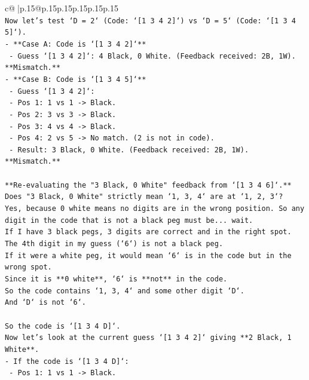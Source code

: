 \documentclass{article}
\begin{document}
{\begin{supertabular}{c@{$\;$}|p{.15\linewidth}@{}p{.15\linewidth}p{.15\linewidth}p{.15\linewidth}p{.15\linewidth}p{.15\linewidth}}
{{{\\ 
\texttt{Now let's test `D = 2` (Code: `{[}1 3 4 2{]}`) vs `D = 5` (Code: `{[}1 3 4 5{]}`).} \\
\texttt{{-} **Case A: Code is `{[}1 3 4 2{]}`**} \\
\texttt{    {-} Guess `{[}1 3 4 2{]}`: 4 Black, 0 White. (Feedback received: 2B, 1W). **Mismatch.**} \\
\texttt{{-} **Case B: Code is `{[}1 3 4 5{]}`**} \\
\texttt{    {-} Guess `{[}1 3 4 2{]}`:} \\
\texttt{        {-} Pos 1: 1 vs 1 {-}> Black.} \\
\texttt{        {-} Pos 2: 3 vs 3 {-}> Black.} \\
\texttt{        {-} Pos 3: 4 vs 4 {-}> Black.} \\
\texttt{        {-} Pos 4: 2 vs 5 {-}> No match. (2 is not in code).} \\
\texttt{        {-} Result: 3 Black, 0 White. (Feedback received: 2B, 1W). **Mismatch.**} \\
\\ 
\texttt{**Re{-}evaluating the "3 Black, 0 White" feedback from `{[}1 3 4 6{]}`.**} \\
\texttt{Does "3 Black, 0 White" strictly mean `1, 3, 4` are at `1, 2, 3`?} \\
\texttt{Yes, because 0 white means no digits are in the wrong position. So any digit in the code that is not a black peg must be... wait.} \\
\texttt{If I have 3 black pegs, 3 digits are correct and in the right spot.} \\
\texttt{The 4th digit in my guess (`6`) is not a black peg.} \\
\texttt{If it were a white peg, it would mean `6` is in the code but in the wrong spot.} \\
\texttt{Since it is **0 white**, `6` is **not** in the code.} \\
\texttt{So the code contains `1, 3, 4` and some other digit `D`.} \\
\texttt{And `D` is not `6`.} \\
\\ 
\texttt{So the code is `{[}1 3 4 D{]}`.} \\
\texttt{Now let's look at the current guess `{[}1 3 4 2{]}` giving **2 Black, 1 White**.} \\
\texttt{{-} If the code is `{[}1 3 4 D{]}`:} \\
\texttt{    {-} Pos 1: 1 vs 1 {-}> Black.} \\
}}}
\end{supertabular}}
\end{document}
